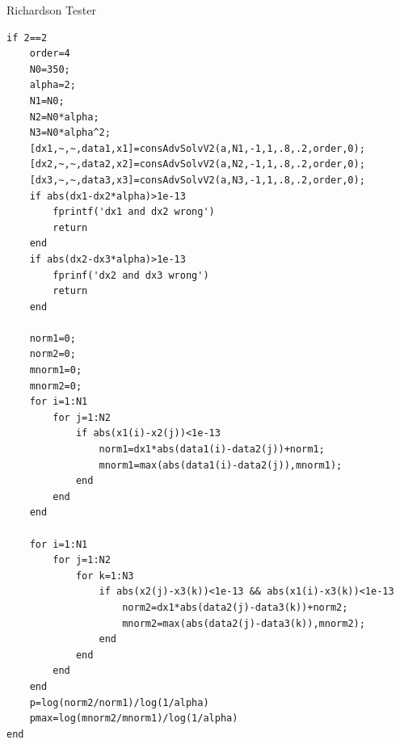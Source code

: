 \pagebreak
Richardson Tester
\begin{lstlisting}[frame=single]
%% Richardson Test
if 2==2
    order=4
    N0=350;
    alpha=2;
    N1=N0;
    N2=N0*alpha;
    N3=N0*alpha^2;
    [dx1,~,~,data1,x1]=consAdvSolvV2(a,N1,-1,1,.8,.2,order,0);
    [dx2,~,~,data2,x2]=consAdvSolvV2(a,N2,-1,1,.8,.2,order,0);
    [dx3,~,~,data3,x3]=consAdvSolvV2(a,N3,-1,1,.8,.2,order,0);
    if abs(dx1-dx2*alpha)>1e-13
        fprintf('dx1 and dx2 wrong')
        return
    end
    if abs(dx2-dx3*alpha)>1e-13
        fprinf('dx2 and dx3 wrong')
        return
    end
        
    norm1=0;
    norm2=0;
    mnorm1=0;
    mnorm2=0;
    for i=1:N1
        for j=1:N2
            if abs(x1(i)-x2(j))<1e-13
                norm1=dx1*abs(data1(i)-data2(j))+norm1;
                mnorm1=max(abs(data1(i)-data2(j)),mnorm1);
            end
        end
    end
    
    for i=1:N1
        for j=1:N2
            for k=1:N3
                if abs(x2(j)-x3(k))<1e-13 && abs(x1(i)-x3(k))<1e-13
                    norm2=dx1*abs(data2(j)-data3(k))+norm2;
                    mnorm2=max(abs(data2(j)-data3(k)),mnorm2);
                end
            end
        end
    end
    p=log(norm2/norm1)/log(1/alpha)
    pmax=log(mnorm2/mnorm1)/log(1/alpha)
end
\end{lstlisting}
